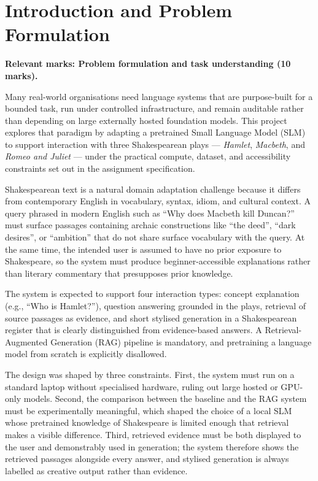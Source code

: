 \documentclass[10pt,conference]{IEEEtran}
\begin{document}
\section{Introduction and Problem Formulation}
\label{sec:introduction}

\textbf{Relevant marks: Problem formulation and task understanding
(10 marks).}

Many real-world organisations need language systems that are
purpose-built for a bounded task, run under controlled
infrastructure, and remain auditable rather than depending on large
externally hosted foundation models. This project explores that
paradigm by adapting a pretrained Small Language Model (SLM) to
support interaction with three Shakespearean plays --- \textit{Hamlet},
\textit{Macbeth}, and \textit{Romeo and Juliet} --- under the
practical compute, dataset, and accessibility constraints set out
in the assignment specification.

Shakespearean text is a natural domain adaptation challenge because
it differs from contemporary English in vocabulary, syntax, idiom,
and cultural context. A query phrased in modern English such as
``Why does Macbeth kill Duncan?'' must surface passages containing
archaic constructions like ``the deed'', ``dark desires'', or
``ambition'' that do not share surface vocabulary with the query.
At the same time, the intended user is assumed to have no prior
exposure to Shakespeare, so the system must produce
beginner-accessible explanations rather than literary commentary
that presupposes prior knowledge.

The system is expected to support four interaction types: concept
explanation (e.g., ``Who is Hamlet?''), question answering grounded
in the plays, retrieval of source passages as evidence, and short
stylised generation in a Shakespearean register that is clearly
distinguished from evidence-based answers. A Retrieval-Augmented
Generation (RAG) pipeline is mandatory, and pretraining a language
model from scratch is explicitly disallowed.

The design was shaped by three constraints. First, the system must
run on a standard laptop without specialised hardware, ruling out
large hosted or GPU-only models. Second, the comparison between the
baseline and the RAG system must be experimentally meaningful, which
shaped the choice of a local SLM whose pretrained knowledge of
Shakespeare is limited enough that retrieval makes a visible
difference. Third, retrieved evidence must be both displayed to the
user and demonstrably used in generation; the system therefore shows
the retrieved passages alongside every answer, and stylised
generation is always labelled as creative output rather than
evidence.
\end{document}

